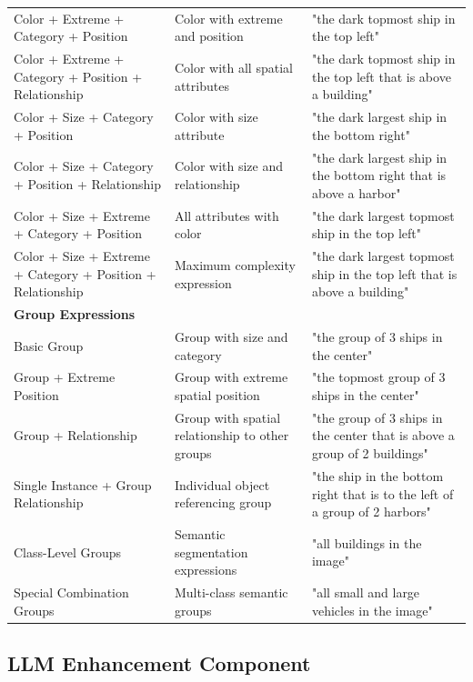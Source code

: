 \begin{table}[H]
{\begin{tabular}{@{}lll@{}}
Color + Extreme + Category + Position & Color with extreme and position & "the dark topmost ship in the top left" \\
Color + Extreme + Category + Position + Relationship & Color with all spatial attributes & "the dark topmost ship in the top left that is above a building" \\
Color + Size + Category + Position & Color with size attribute & "the dark largest ship in the bottom right" \\
Color + Size + Category + Position + Relationship & Color with size and relationship & "the dark largest ship in the bottom right that is above a harbor" \\
Color + Size + Extreme + Category + Position & All attributes with color & "the dark largest topmost ship in the top left" \\
Color + Size + Extreme + Category + Position + Relationship & Maximum complexity expression & "the dark largest topmost ship in the top left that is above a building" \\
\midrule
\multicolumn{3}{l}{\textbf{Group Expressions}} \\
\midrule
Basic Group & Group with size and category & "the group of 3 ships in the center" \\
Group + Extreme Position & Group with extreme spatial position & "the topmost group of 3 ships in the center" \\
Group + Relationship & Group with spatial relationship to other groups & "the group of 3 ships in the center that is above a group of 2 buildings" \\
Single Instance + Group Relationship & Individual object referencing group & "the ship in the bottom right that is to the left of a group of 2 harbors" \\
Class-Level Groups & Semantic segmentation expressions & "all buildings in the image" \\
Special Combination Groups & Multi-class semantic groups & "all small and large vehicles in the image" \\
\bottomrule
\end{tabular}%
}
\end{table}

\subsection{LLM Enhancement Component}

